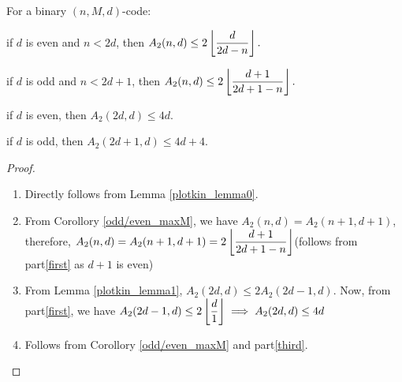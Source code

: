 \documentclass[../main.tex]{subfiles}
\begin{document}
\begin{thm}
	For a binary $(n,M,d)$-code:	\\
	\begin{enumerate*}[label=(\roman*), before=\unskip{}]
		\item if $d$ is even and $n<2d$, then
			\(
				A_2(n,d)\leq 2\left\lfloor \dfrac{d}{2d-n} \right\rfloor.
			\)\\
		\item if $d$ is odd and $n<2d+1$, then
			\(
				A_2(n,d)\leq 2\left\lfloor \dfrac{d+1}{2d+1-n} \right\rfloor.
			\)\\
		\item if $d$ is even, then $A_2(2d,d)\leq 4d$.\\
		\item if $d$ is odd, then $A_2(2d+1,d)\leq 4d+4$.\\ 
	\end{enumerate*}		
\end{thm}

\begin{proof}
	\begin{enumerate}[label=(\roman*), before=\unskip{}]
	\itemsep-1mm
		\item\label{first} Directly follows from Lemma \ref{plotkin_lemma0}.\\
		\item From Corollory \ref{odd/even_maxM}, we have $A_2(n,d)=A_2(n+1,d+1)$, therefore,
		\(
			A_2(n,d) = A_2(n+1,d+1) = 2\left\lfloor \dfrac{d+1}{2d+1-n} \right\rfloor	
		\)(follows from part\ref{first} as $d+1$ is even)
		\item\label{third} From Lemma \ref{plotkin_lemma1}, $A_2(2d,d)\leq 2A_2(2d-1,d)$. Now, from part\ref{first}, we have $A_2(2d-1,d)\leq 2\left\lfloor \dfrac{d}{1} \right\rfloor \implies A_2(2d,d)\leq 4d$
		\item Follows from Corollory \ref{odd/even_maxM} and part\ref{third}. 
	\end{enumerate}
\end{proof}
\end{document}
